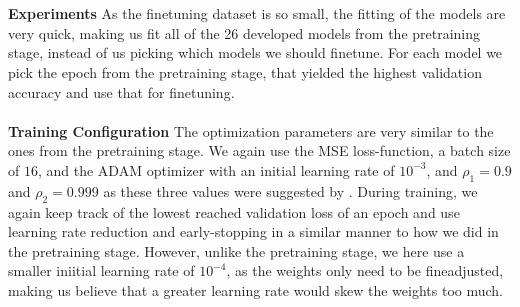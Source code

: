 \documentclass[./main.tex]{subfiles}
\begin{document}
\\
\\
\textbf{Experiments} As the finetuning dataset is so small, the fitting of the models are very quick, making us fit all of the 26 developed models from the pretraining stage, instead of us picking which models we should finetune. For each model we pick the epoch from the pretraining stage, that yielded the highest validation accuracy and use that for finetuning.
\\
\\
\textbf{Training Configuration} The optimization parameters are very similar to the ones from the pretraining stage. We again use the MSE loss-function, a batch size of $16$, and the ADAM optimizer with an initial learning rate of $10^{-3}$, and $\rho_1 = 0.9$ and $\rho_{2} = 0.999$ as these three values were suggested by \cite{DL_book}. During training, we again keep track of the lowest reached validation loss of an epoch and use learning rate reduction and early-stopping in a similar manner to how we did in the pretraining stage. However, unlike the pretraining stage, we here use a smaller iniitial learning rate of $10^{-4}$, as the weights only need to be fineadjusted, making us believe that a greater learning rate would skew the weights too much.
\end{document}

